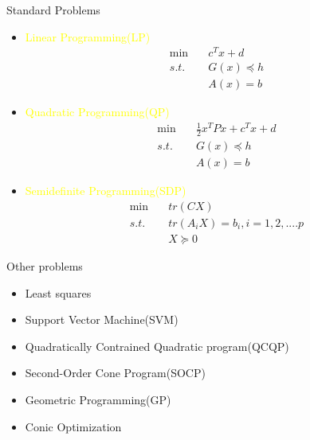     \begin{frame}{Standard Problems}
      \vspace{-2pt}
      \begin{itemize}
        \item \textcolor{yellow}{Linear Programming(LP)}
        \[
        \begin{aligned}
        \min &\quad c^Tx+d \\
        s.t. &\quad G(x) \preceq h \\
            &\quad A(x) = b
        \end{aligned}
        \]
        \item \textcolor{yellow}{Quadratic Programming(QP)}
        \[
        \begin{aligned}
        \min &\quad \frac{1}{2}x^TPx+c^Tx+d \\
        s.t. &\quad G(x) \preceq h \\
             &\quad A(x) = b
        \end{aligned}
        \]
        \item \textcolor{yellow}{Semidefinite Programming(SDP)}
        \[
        \begin{aligned}
        \min &\quad tr(CX) \\
        s.t. &\quad tr(A_iX)=b_i, i=1,2,....p \\
             &\quad X \succeq 0
        \end{aligned}
        \]
      \end{itemize}
    \end{frame}

    \begin{frame}{Other problems}
      \Large
      \begin{itemize}
        \item Least squares
        \item Support Vector Machine(SVM)
        \item Quadratically Contrained Quadratic program(QCQP)
        \item Second-Order Cone Program(SOCP)
        \item Geometric Programming(GP)
        \item Conic Optimization
      \end{itemize}
    \end{frame}

